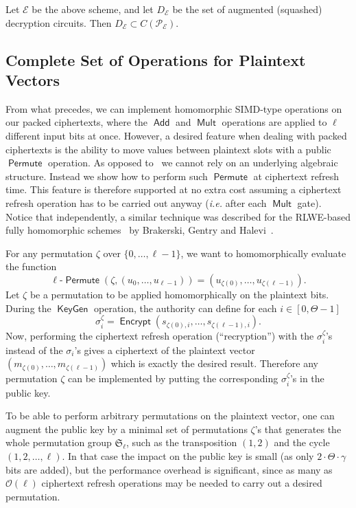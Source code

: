 \documentclass[11pt]{llncs}
\newcommand{\ie}{\textsl{i.e.}\xspace}
\DeclareMathOperator{\KeyGen}{\ensuremath{\mathsf{KeyGen}}}
\DeclareMathOperator{\Encrypt}{\ensuremath{\mathsf{Encrypt}}}
\DeclareMathOperator{\Add}{\ensuremath{\mathsf{Add}}}
\DeclareMathOperator{\Mult}{\ensuremath{\mathsf{Mult}}}
\DeclareMathOperator{\Permute}{\ensuremath{\mathsf{Permute}}}
\renewcommand*\O{\ensuremath{\mathcal O}}
\begin{document}
\begin{theorem}Let $\mathcal E$ be the above scheme, and let
  $D_{\mathcal E}$ be the set of augmented (squashed) decryption
  circuits. Then $D_{\mathcal E}\subset C(\mathcal{P_E})$. 
\end{theorem}


\subsection{Complete Set of Operations for Plaintext Vectors}\label{subsec:permutations}

From what precedes, we can implement homomorphic SIMD-type operations on
our packed ciphertexts, where the $\Add$ and $\Mult$ operations are
applied to $\ell$ different input bits at once. However, a desired
feature when dealing with packed ciphertexts is the ability to move
values between plaintext slots with a public $\Permute$ operation. As opposed to~\cite{GHS2012a} we cannot rely on an underlying algebraic structure.
Instead we show how to perform  such $\Permute$ at ciphertext refresh time.
This feature is therefore supported at no extra cost assuming a
ciphertext refresh operation has to be carried out anyway (\ie after each
$\Mult$ gate). Notice that independently, a similar technique was described 
for the RLWE-based fully homomorphic schemes~\cite{BV2011a,BV2011b,GHS2012a}
by Brakerski, Gentry and Halevi~\cite{BGH2013}.

\smallskip
For any permutation $\zeta$ over $\{0,\ldots,{\ell-1}\}$, we want to homomorphically evaluate the function
\[ \text{$\ell$-$\Permute$}\left(\zeta,\left(u_0,\ldots,u_{\ell-1}\right)\right) = \left(u_{\zeta(0)},\ldots,u_{\zeta({\ell-1})}\right). \]
Let $\zeta$ be a permutation to be applied  homomorphically on the plaintext bits. During the $\KeyGen$ operation, the authority can define for each $i\in[0,\Theta-1]$
\[ \sigma_{i}^{\zeta} = \Encrypt(s_{\zeta(0),i},\ldots,s_{\zeta(\ell-1),i}). \]
Now, performing the ciphertext refresh operation (``recryption'') with the $\sigma_i^\zeta$'s instead of the $\sigma_i$'s gives a ciphertext of the plaintext vector
$(m_{\zeta(0)},\ldots,m_{\zeta(\ell-1)})$
which is exactly the desired result. Therefore any permutation $\zeta$
can be implemented by putting the corresponding $\sigma^\zeta_i$'s in the public key.

To be able to perform arbitrary permutations on the plaintext vector, one
can augment the public key by a minimal set of permutations $\zeta$'s
that generates the whole permutation group $\mathfrak S_\ell$, such as
the transposition $(1,2)$ and the cycle $(1,2,\ldots,\ell)$. In that case
the impact on the public key is small (as only $2\cdot \Theta\cdot
\gamma$ bits are added), but the performance overhead is significant,
since as many as $\O(\ell)$ ciphertext refresh operations may be needed to
carry out a desired permutation.
\end{document}
